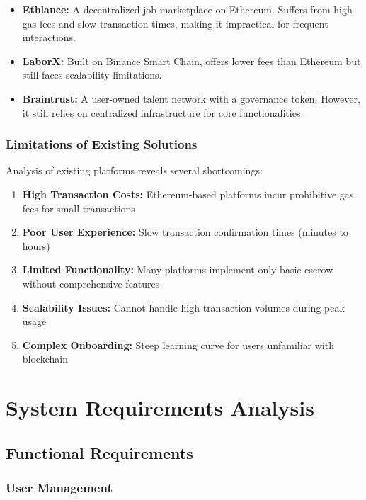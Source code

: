 \documentclass[a4paper,13pt,twoside]{report}
\theoremstyle{definition}
\begin{document}
\begin{itemize}
    \item \textbf{Ethlance:} A decentralized job marketplace on Ethereum. Suffers from high gas fees and slow transaction times, making it impractical for frequent interactions.
    \item \textbf{LaborX:} Built on Binance Smart Chain, offers lower fees than Ethereum but still faces scalability limitations.
    \item \textbf{Braintrust:} A user-owned talent network with a governance token. However, it still relies on centralized infrastructure for core functionalities.
\end{itemize}

\subsubsection{Limitations of Existing Solutions}

Analysis of existing platforms reveals several shortcomings:

\begin{enumerate}
    \item \textbf{High Transaction Costs:} Ethereum-based platforms incur prohibitive gas fees for small transactions
    \item \textbf{Poor User Experience:} Slow transaction confirmation times (minutes to hours)
    \item \textbf{Limited Functionality:} Many platforms implement only basic escrow without comprehensive features
    \item \textbf{Scalability Issues:} Cannot handle high transaction volumes during peak usage
    \item \textbf{Complex Onboarding:} Steep learning curve for users unfamiliar with blockchain
\end{enumerate}

\section{System Requirements Analysis}

\subsection{Functional Requirements}

\subsubsection{User Management}
\end{document}

